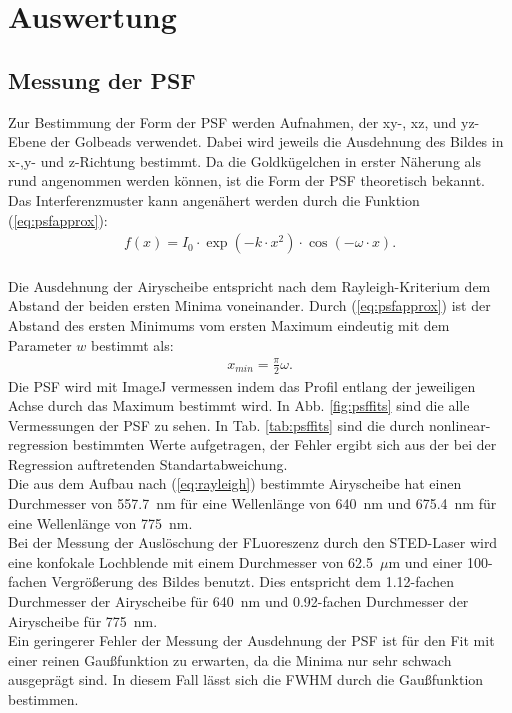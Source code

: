 \section{Auswertung}
\subsection{Messung der PSF}
Zur Bestimmung der Form der PSF werden Aufnahmen, der xy-, xz, und yz-Ebene der Golbeads verwendet. 
Dabei wird jeweils die Ausdehnung des Bildes in x-,y- und z-Richtung bestimmt.
Da die Goldkügelchen in erster Näherung als rund angenommen werden können, ist die Form der PSF theoretisch bekannt.
Das Interferenzmuster kann angenähert werden durch die Funktion (\ref{eq:psfapprox}):
\begin{align}
	f(x)=I_0 \cdot \exp \left( -k \cdot x^2 \right) \cdot \cos \left(-\omega\cdot x\right). \label{eq:psfapprox}
\end{align}
\\ 
Die Ausdehnung der Airyscheibe entspricht nach dem Rayleigh-Kriterium dem Abstand der beiden ersten Minima voneinander. 
Durch (\ref{eq:psfapprox}) ist der Abstand des ersten Minimums vom ersten Maximum eindeutig mit dem Parameter $w$ bestimmt als:
\begin{align}
x_{min} = \frac{\pi}{2}\omega.
\end{align}
Die PSF wird mit ImageJ vermessen indem das Profil entlang der jeweiligen Achse durch das Maximum bestimmt wird.
In Abb. \ref{fig:psffits} sind die alle Vermessungen der PSF zu sehen. In Tab. \ref{tab:psffits} sind die durch nonlinear-regression bestimmten Werte aufgetragen, der Fehler ergibt sich aus der bei der Regression auftretenden Standartabweichung.
\\
Die aus dem Aufbau nach (\ref{eq:rayleigh}) bestimmte Airyscheibe hat einen Durchmesser von 557.7~nm für eine Wellenlänge von 640~nm und 675.4~nm für eine Wellenlänge von 775~nm.
\\
Bei der Messung der Auslöschung der FLuoreszenz durch den STED-Laser wird eine konfokale Lochblende mit einem Durchmesser von 62.5~$\mu$m und einer 100-fachen Vergrößerung des Bildes benutzt. 
Dies entspricht dem 1.12-fachen Durchmesser der Airyscheibe für 640~nm und 0.92-fachen Durchmesser der Airyscheibe für 775~nm.
\\ 
Ein geringerer Fehler der Messung der Ausdehnung der PSF ist für den Fit mit einer reinen Gaußfunktion zu erwarten, da die Minima nur sehr schwach ausgeprägt sind. 
In diesem Fall lässt sich die FWHM durch die Gaußfunktion bestimmen.
